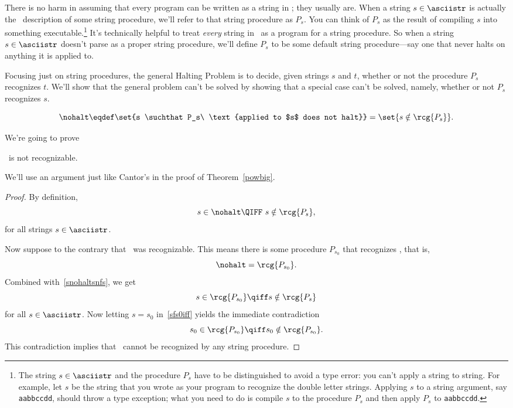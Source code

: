 There is no harm in assuming that every program can be written as a
string in \asciistr; they usually are.  When a string $s \in
\asciistr$ is actually the \asciibet\ description of some string
procedure, we'll refer to that string procedure as $P_s$.  You can
think of $P_s$ as the result of compiling $s$ into something
executable.\footnote{The string $s \in \asciistr$ and the procedure
  $P_s$ have to be distinguished to avoid a type error: you can't
  apply a string to string.  For example, let $s$ be the string that
  you wrote as your program to recognize the double letter strings.
  Applying $s$ to a string argument, say \texttt{aabbccdd}, should
  throw a type exception; what you need to do is compile $s$ to the
  procedure $P_s$ and then apply $P_s$ to \texttt{aabbccdd}.} It's
technically helpful to treat \emph{every} string in \asciistr\ as a
program for a string procedure.  So when a string $s \in \asciistr$
doesn't parse as a proper string procedure, we'll define $P_s$ to be
some default string procedure---say one that never halts on anything
it is applied to.

Focusing just on string procedures, the general Halting Problem is to
decide, given strings $s$ and $t$, whether or not the procedure $P_s$
recognizes $t$.  We'll show that the general problem can't be solved
by showing that a special case can't be solved, namely, whether or not
$P_s$ recognizes $s$.

\begin{definition}\label{nohalt_def}
\begin{equation}\label{nohalt_eqdef}
\nohalt \eqdef \set{s \suchthat P_s\ \text{applied to $s$ does not halt}} = \set{s \notin \rcg{P_s}}.
\end{equation}
\end{definition}
We're going to prove
\begin{theorem}\label{nohalt_thm}
\nohalt\ is not recognizable.
\end{theorem}

We'll use an argument just like Cantor's in the proof of
Theorem~\ref{powbig}.

\begin{proof}
By definition, 
\begin{equation}\label{snohaltsnfs}
s \in \nohalt \QIFF\ s \notin \rcg{P_s},
\end{equation}
for all strings $s \in \asciistr$.

Now suppose to the contrary that \nohalt\ was recognizable.  This
means there is some procedure $P_{s_0}$ that recognizes \nohalt, that is,
\[
\nohalt = \rcg{P_{s_0}}.
\]
Combined with~\eqref{snohaltsnfs}, we get
\begin{equation}\label{sfs0iff}
s \in \rcg{P_{s_0}} \qiff s \notin \rcg{P_s}
\end{equation}
for all $s \in \asciistr$.  Now letting $s = s_0$ in~\eqref{sfs0iff}
yields the immediate contradiction
\[
s_0 \in \rcg{P_{s_0}} \qiff s_0 \notin \rcg{P_{s_0}}.
\]
This contradiction implies that \nohalt\ cannot be recognized by any
string procedure.
\end{proof}

